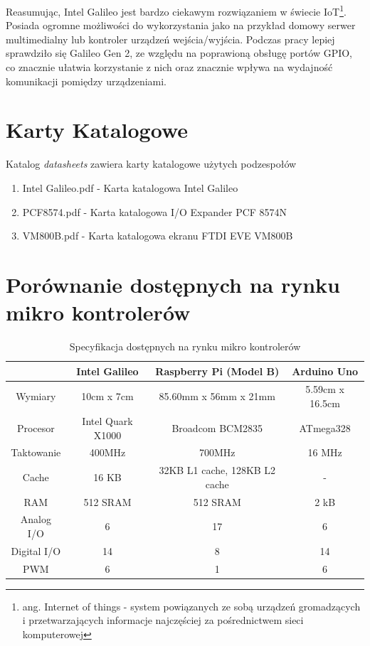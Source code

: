 \documentclass{xmgr}
\begin{document}
Reasumując, Intel Galileo jest bardzo ciekawym rozwiązaniem w świecie IoT\footnote{ang. Internet of things - system powiązanych ze sobą urządzeń gromadzących i przetwarzających informacje najczęściej za pośrednictwem sieci komputerowej}. Posiada ogromne możliwości do wykorzystania jako na przykład domowy serwer multimedialny lub kontroler urządzeń wejścia/wyjścia. Podczas pracy lepiej sprawdziło się Galileo Gen 2, ze względu na poprawioną obsługę portów GPIO, co znacznie ułatwia korzystanie z nich oraz znacznie wpływa na wydajność komunikacji pomiędzy urządzeniami.

\appendix
\chapter{Karty Katalogowe}
Katalog \emph{datasheets} zawiera karty katalogowe użytych podzespołów
\begin{enumerate} 
\item Intel Galileo.pdf - Karta katalogowa Intel Galileo
\item PCF8574.pdf - Karta katalogowa I/O Expander PCF 8574N
\item VM800B.pdf - Karta katalogowa ekranu FTDI EVE VM800B
\end{enumerate}
\chapter{Porównanie dostępnych na rynku mikro kontrolerów}
\begin{table}[!tbh]
\begin{tabular}{|c|c|c|c|} \hline
 & \textbf{Intel Galileo} & \textbf{Raspberry Pi (Model B)} & \textbf{Arduino Uno} \\ \hline
Wymiary & 10cm x 7cm & 85.60mm x 56mm x 21mm & 5.59cm x 16.5cm \\ \hline
Procesor & Intel Quark X1000 & Broadcom BCM2835 & ATmega328 \\ \hline
Taktowanie & 400MHz	& 700MHz & 16 MHz\\ \hline
Cache & 16 KB & 32KB L1 cache, 128KB L2 cache & - \\ \hline
RAM & 512 SRAM & 512 SRAM & 2 kB \\ \hline
Analog I/O	& 6 & 17 & 6 \\ \hline
Digital I/O	& 14 & 8 & 14 \\ \hline
PWM	& 6 & 1 & 6 \\ \hline
\end{tabular}
\caption{Specyfikacja dostępnych na rynku mikro kontrolerów}
\end{table}
\end{document}
